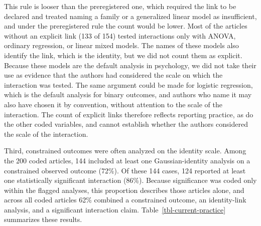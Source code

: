\documentclass[
  man,
  floatsintext,
  longtable,
  nolmodern,
  notxfonts,
  notimes,
  colorlinks=true,linkcolor=blue,citecolor=blue,urlcolor=blue]{apa7}
\begin{document}
This rule is looser than the preregistered one, which required the link
to be declared and treated naming a family or a generalized linear model
as insufficient, and under the preregistered rule the count would be
lower. Most of the articles without an explicit link (133 of 154) tested
interactions only with ANOVA, ordinary regression, or linear mixed
models. The names of these models also identify the link, which is the
identity, but we did not count them as explicit. Because these models
are the default analysis in psychology, we did not take their use as
evidence that the authors had considered the scale on which the
interaction was tested. The same argument could be made for logistic
regression, which is the default analysis for binary outcomes, and
authors who name it may also have chosen it by convention, without
attention to the scale of the interaction. The count of explicit links
therefore reflects reporting practice, as do the other coded variables,
and cannot establish whether the authors considered the scale of the
interaction.

Third, constrained outcomes were often analyzed on the identity scale.
Among the 200 coded articles, 144 included at least one
Gaussian-identity analysis on a constrained observed outcome (72\%). Of
these 144 cases, 124 reported at least one statistically significant
interaction (86\%). Because significance was coded only within the
flagged analyses, this proportion describes those articles alone, and
across all coded articles 62\% combined a constrained outcome, an
identity-link analysis, and a significant interaction claim.
Table~\ref{tbl-current-practice} summarizes these results.
\end{document}
